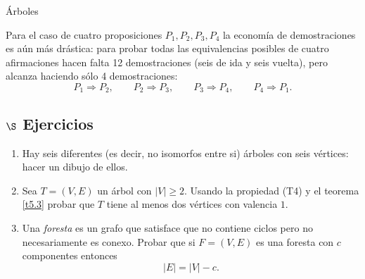 \begin{section}{Árboles}
\begin{observacion}
Para el caso de cuatro proposiciones $P_1,P_2,P_3,P_4$ la economía de demostraciones es aún más drástica: para probar todas las equivalencias posibles de cuatro afirmaciones hacen falta 12 demostraciones (seis de ida y seis vuelta), pero alcanza haciendo sólo 4 demostraciones:
$$
P_1 \Rightarrow P_2,\qquad P_2 \Rightarrow P_3,\qquad P_3 \Rightarrow P_4,\qquad P_4 \Rightarrow P_1. 
$$ 
\end{observacion}


\subsection*{\Large $\S$ Ejercicios}\label{ejercicios5.5}
\begin{enumerate}
\item \label{ejercicio5.5.1} Hay seis diferentes (es decir, no isomorfos entre si) árboles con
seis vértices: hacer un dibujo de ellos.
\item Sea $T=(V,E)$ un árbol con $|V| \ge 2$. Usando la propiedad (T4) y el teorema
\ref{t5.3}
probar que $T$ tiene al menos dos vértices con valencia $1$.
\item Una {\em foresta} es un grafo que satisface que no contiene ciclos pero no
necesariamente es conexo. Probar que si $F=(V,E)$ es una foresta con
$c$ componentes entonces
$$
|E|=|V|-c.
$$
\end{enumerate}

\end{section}



